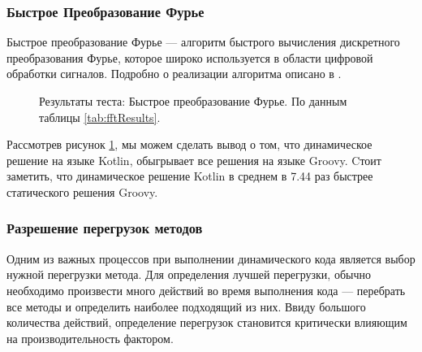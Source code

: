 \subsubsection{Быстрое Преобразование Фурье}

Быстрое преобразование Фурье --- алгоритм быстрого вычисления дискретного преобразования Фурье, которое широко используется в области цифровой обработки сигналов. Подробно о реализации алгоритма описано в \cite{algo:dasgypta2014algo}.



\begin{figure}
\caption{\label{graph:fftResults}Результаты теста: Быстрое преобразование Фурье. По данным таблицы \ref{tab:fftResults}.}
\end{figure}


Рассмотрев рисунок \ref{graph:fftResults}, мы можем сделать вывод о том, что динамическое решение на языке Kotlin, обыгрывает все решения на языке Groovy. %
Cтоит заметить, что динамическое решение Kotlin в среднем в 7.44 раз быстрее статического решения Groovy.


\subsubsection{Разрешение перегрузок методов}
\label{sec:benchOverloadsResolv}

Одним из важных процессов при выполнении динамического кода является выбор нужной перегрузки метода. Для определения лучшей перегрузки, обычно необходимо произвести много действий во время выполнения кода --- перебрать все методы и определить наиболее подходящий из них. Ввиду большого количества действий, определение перегрузок становится критически влияющим на производительность фактором.



